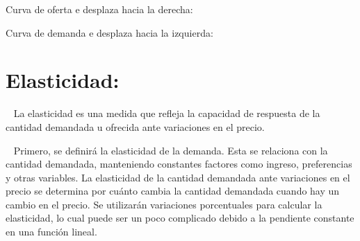 \documentclass[
  letterpaper,
  DIV=11,
  numbers=noendperiod]{scrreport}
\begin{document}
\begin{multicols}{2}

\begin{center}
    \indent Curva de oferta e desplaza hacia la derecha:
    
\end{center}
 
\begin{center}
    \indent Curva de demanda e desplaza hacia la izquierda:
    
\end{center}

\end{multicols}

\hypertarget{elasticidad}{%
\section{Elasticidad:}\label{elasticidad}}

~ La elasticidad es una medida que refleja la capacidad de respuesta de
la cantidad demandada u ofrecida ante variaciones en el precio.

~ Primero, se definirá la elasticidad de la demanda. Esta se relaciona
con la cantidad demandada, manteniendo constantes factores como ingreso,
preferencias y otras variables. La elasticidad de la cantidad demandada
ante variaciones en el precio se determina por cuánto cambia la cantidad
demandada cuando hay un cambio en el precio. Se utilizarán variaciones
porcentuales para calcular la elasticidad, lo cual puede ser un poco
complicado debido a la pendiente constante en una función lineal.
\end{document}
